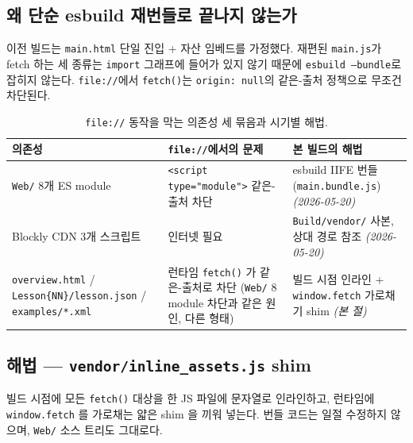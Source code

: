 \documentclass[11pt, oneside]{article}
\begin{document}
\subsection{왜 단순 esbuild 재번들로 끝나지 않는가}

이전 빌드는 \texttt{main.html} 단일 진입 + 자산 임베드를 가정했다.
재편된 \texttt{main.js}가 fetch 하는 세 종류는 \texttt{import} 그래프에
들어가 있지 않기 때문에 \texttt{esbuild --bundle}로 잡히지 않는다.
\texttt{file://}에서 \texttt{fetch()}는 \texttt{origin: null}의 같은-출처
정책으로 무조건 차단된다.

\begin{table}[h]
\centering
\small
\begin{tabularx}{\linewidth}{@{}lXX@{}}
\toprule
의존성 & \texttt{file://}에서의 문제 & 본 빌드의 해법 \\
\midrule
\texttt{Web/} 8개 ES module               & \texttt{<script type="module">} 같은-출처 차단 & esbuild IIFE 번들 (\texttt{main.bundle.js}) \emph{(2026-05-20)} \\
Blockly CDN 3개 스크립트                   & 인터넷 필요 & \texttt{Build/vendor/} 사본, 상대 경로 참조 \emph{(2026-05-20)} \\
\texttt{overview.html} / \texttt{Lesson\{NN\}/lesson.json} / \texttt{examples/*.xml}
  & 런타임 \texttt{fetch()} 가 같은-출처로 차단 (\texttt{Web/} 8 module 차단과 같은 원인, 다른 형태)
  & 빌드 시점 인라인 + \texttt{window.fetch} 가로채기 shim \emph{(본 절)} \\
\bottomrule
\end{tabularx}
\caption{\texttt{file://} 동작을 막는 의존성 세 묶음과 시기별 해법.}
\end{table}

\subsection{해법 --- \texttt{vendor/inline\_assets.js} shim}

빌드 시점에 모든 \texttt{fetch()} 대상을 한 JS 파일에 문자열로 인라인하고,
런타임에 \texttt{window.fetch} 를 가로채는 얇은 shim 을 끼워 넣는다.
번들 코드는 일절 수정하지 않으며, \texttt{Web/} 소스 트리도 그대로다.
\end{document}
